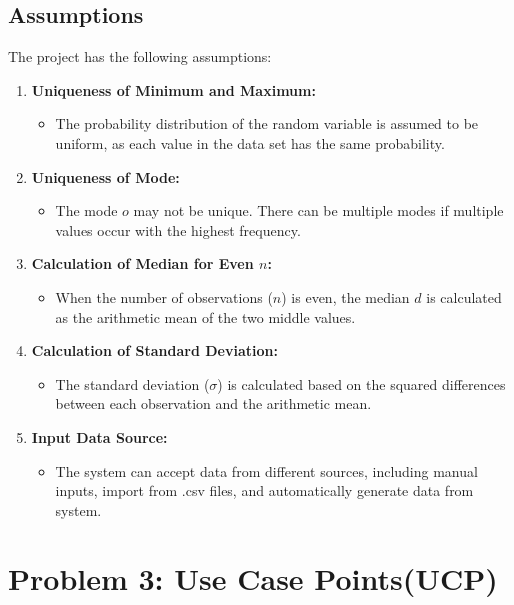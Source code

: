 \documentclass[english,12pt,a4paper]{report}
\begin{document}
	\section{Assumptions}
	The project has the following assumptions:
	\begin{enumerate}
	
	\item \textbf{Uniqueness of Minimum and Maximum:} 
	\begin{itemize}
		\item The probability distribution of the random variable is assumed to be uniform, as each value in the data set has the same probability.
	\end{itemize}

	\item \textbf{Uniqueness of Mode:} 
	\begin{itemize}
	\item The mode $o$ may not be unique. There can be multiple modes if multiple values occur with the highest frequency.
	\end{itemize}
	
	\item \textbf{Calculation of Median for Even $n$:} 
	\begin{itemize}
		\item When the number of observations ($n$) is even, the median $d$ is calculated as the arithmetic mean of the two middle values.
	\end{itemize}

	\item \textbf{Calculation of Standard Deviation:} 
	\begin{itemize}
	\item The standard deviation ($\sigma$) is calculated based on the squared differences between each observation and the arithmetic mean.
	\end{itemize}

	\item \textbf{Input Data Source:} 
	\begin{itemize}
		\item The system can accept data from different sources, including manual inputs, import from .csv files, and automatically generate data from system.
	\end{itemize}
	\end{enumerate}
	
	
	\chapter{Problem 3: Use Case Points(UCP)}
\end{document}
